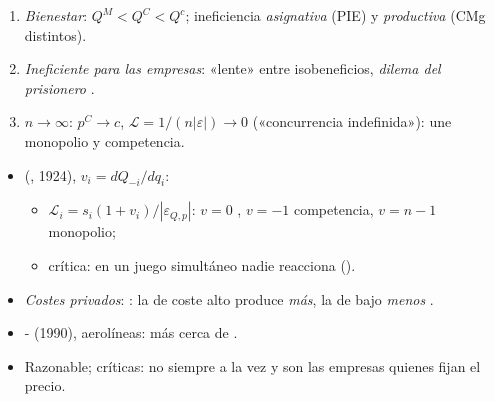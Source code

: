 \documentclass{article}
\begin{document}
\begin{columnas}
\begin{itemize}
\begin{enumerate}
  \item \emph{Bienestar}: $Q^M<Q^C<Q^c$; ineficiencia \emph{asignativa} (PIE) y \emph{productiva} (CMg distintos).
  \item \emph{Ineficiente para las empresas}: «lente» entre isobeneficios, \emph{dilema del prisionero} .
  \item $n\to\infty$: $p^C\to c$, $\mathcal{L}=1/(n|\varepsilon|)\to0$ («concurrencia indefinida»): une monopolio y competencia.
  \end{enumerate}
\end{itemize}
\begin{itemize}
\item {} (, 1924), $v_i=dQ_{-i}/dq_i$:
  \begin{itemize}
  \item $\mathcal{L}_i=s_i(1+v_i)/|\varepsilon_{Q,p}|$: $v=0$ , $v=-1$ competencia, $v=n-1$ monopolio;
  \item crítica: en un juego simultáneo nadie reacciona ().
  \end{itemize}
\item \emph{Costes privados}: : la de coste alto produce \emph{más}, la de bajo \emph{menos} .
\end{itemize}
\begin{itemize}
\item {}- (1990), aerolíneas: más cerca de .
\item Razonable; críticas: no siempre a la vez y son las empresas quienes fijan el precio.
\end{itemize}


\end{columnas}
\end{document}
